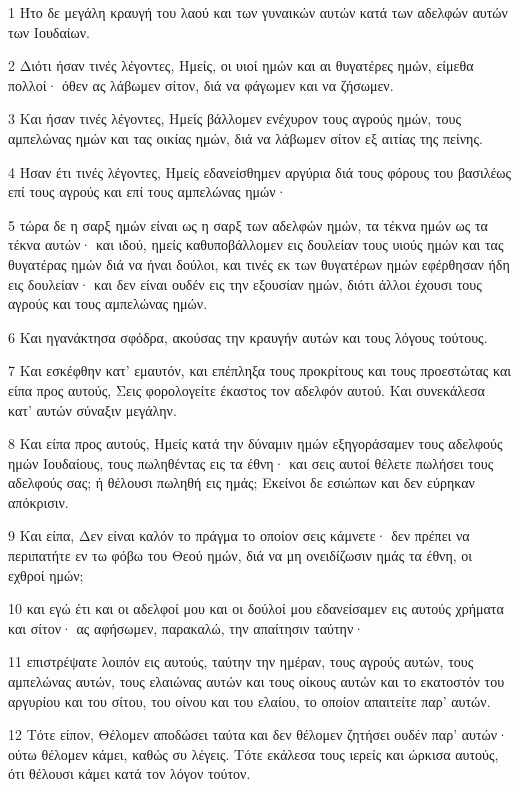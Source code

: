 \par 1 Ήτο δε μεγάλη κραυγή του λαού και των γυναικών αυτών κατά των αδελφών αυτών των Ιουδαίων.
\par 2 Διότι ήσαν τινές λέγοντες, Ημείς, οι υιοί ημών και αι θυγατέρες ημών, είμεθα πολλοί· όθεν ας λάβωμεν σίτον, διά να φάγωμεν και να ζήσωμεν.
\par 3 Και ήσαν τινές λέγοντες, Ημείς βάλλομεν ενέχυρον τους αγρούς ημών, τους αμπελώνας ημών και τας οικίας ημών, διά να λάβωμεν σίτον εξ αιτίας της πείνης.
\par 4 Ήσαν έτι τινές λέγοντες, Ημείς εδανείσθημεν αργύρια διά τους φόρους του βασιλέως επί τους αγρούς και επί τους αμπελώνας ημών·
\par 5 τώρα δε η σαρξ ημών είναι ως η σαρξ των αδελφών ημών, τα τέκνα ημών ως τα τέκνα αυτών· και ιδού, ημείς καθυποβάλλομεν εις δουλείαν τους υιούς ημών και τας θυγατέρας ημών διά να ήναι δούλοι, και τινές εκ των θυγατέρων ημών εφέρθησαν ήδη εις δουλείαν· και δεν είναι ουδέν εις την εξουσίαν ημών, διότι άλλοι έχουσι τους αγρούς και τους αμπελώνας ημών.
\par 6 Και ηγανάκτησα σφόδρα, ακούσας την κραυγήν αυτών και τους λόγους τούτους.
\par 7 Και εσκέφθην κατ' εμαυτόν, και επέπληξα τους προκρίτους και τους προεστώτας και είπα προς αυτούς, Σεις φορολογείτε έκαστος τον αδελφόν αυτού. Και συνεκάλεσα κατ' αυτών σύναξιν μεγάλην.
\par 8 Και είπα προς αυτούς, Ημείς κατά την δύναμιν ημών εξηγοράσαμεν τους αδελφούς ημών Ιουδαίους, τους πωληθέντας εις τα έθνη· και σεις αυτοί θέλετε πωλήσει τους αδελφούς σας; ή θέλουσι πωληθή εις ημάς; Εκείνοι δε εσιώπων και δεν εύρηκαν απόκρισιν.
\par 9 Και είπα, Δεν είναι καλόν το πράγμα το οποίον σεις κάμνετε· δεν πρέπει να περιπατήτε εν τω φόβω του Θεού ημών, διά να μη ονειδίζωσιν ημάς τα έθνη, οι εχθροί ημών;
\par 10 και εγώ έτι και οι αδελφοί μου και οι δούλοί μου εδανείσαμεν εις αυτούς χρήματα και σίτον· ας αφήσωμεν, παρακαλώ, την απαίτησιν ταύτην·
\par 11 επιστρέψατε λοιπόν εις αυτούς, ταύτην την ημέραν, τους αγρούς αυτών, τους αμπελώνας αυτών, τους ελαιώνας αυτών και τους οίκους αυτών και το εκατοστόν του αργυρίου και του σίτου, του οίνου και του ελαίου, το οποίον απαιτείτε παρ' αυτών.
\par 12 Τότε είπον, Θέλομεν αποδώσει ταύτα και δεν θέλομεν ζητήσει ουδέν παρ' αυτών· ούτω θέλομεν κάμει, καθώς συ λέγεις. Τότε εκάλεσα τους ιερείς και ώρκισα αυτούς, ότι θέλουσι κάμει κατά τον λόγον τούτον.

